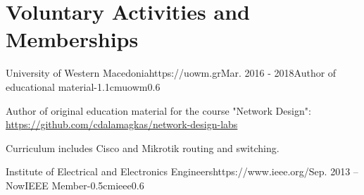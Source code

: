 \documentclass{mycv}
\begin{document}
	\section{Voluntary Activities and Memberships}
	\vspace*{0.125cm}	
	\begin{EntryDatedLogo}{University of Western Macedonia}{https://uowm.gr}{Mar. 2016 - 2018}{Author of educational material}{-1.1cm}{uowm}{0.6}
		\begin{Itemize}
			\item Author of original education material for the course "Network Design": \url{https://github.com/cdalamagkas/network-design-labs}
			\item Curriculum includes Cisco and Mikrotik routing and switching.
		\end{Itemize}
	\end{EntryDatedLogo}

	\vspace*{0.5cm}

	\begin{EntryDatedLogo}{Institute of Electrical and Electronics Engineers}{https://www.ieee.org/}{Sep. 2013 -- Now}{IEEE Member}{-0.5cm}{ieee}{0.6}
	\end{EntryDatedLogo}

\end{document}

